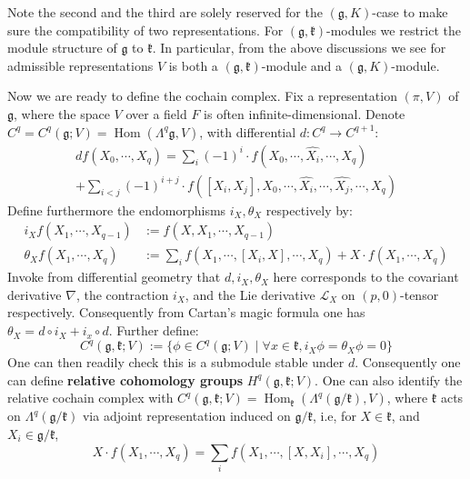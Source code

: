 \documentclass[11pt]{report}
\theoremstyle{definition}
\theoremstyle{plain}
\DeclareMathOperator{\Hom}{Hom}
\renewcommand{\hat}{\widehat}
\newcommand{\Lie}[1]{\mathfrak{#1}}
\begin{document}
Note the second and the third are solely reserved for the $(\Lie{g}, K)$-case to make sure the compatibility of two representations. For $(\Lie{g}, \Lie{k})$-modules we restrict the module structure of $\Lie{g}$ to $\Lie{k}$. In particular, from the above discussions we see for admissible representations $V$ is both a $(\Lie{g}, \Lie{k})$-module and a $(\Lie{g}, K)$-module.
\par Now we are ready to define the cochain complex. Fix a representation $(\pi, V)$ of $\Lie{g}$, where the space $V$ over a field $F$ is often infinite-dimensional. Denote $C^q=C^q(\Lie{g}; V)=\Hom(\Lambda^q\Lie{g}, V)$, with differential $d:C^q\to C^{q+1}$:
\begin{multline}\label{borel1.1.1}
df(X_0,\cdots , X_q)=\sum_i(-1)^i\cdot f(X_0, \cdots, \hat{X_i}, \cdots, X_q)\\
+\sum_{i<j}(-1)^{i+j}\cdot f([X_i, X_j], X_0, \cdots , \hat{X_i}, \cdots, \hat{X_j}, \cdots, X_q)
\end{multline}
Define furthermore the endomorphisms $i_X, \theta_X$ respectively by:
\begin{equation}
\begin{split}
i_Xf(X_1, \cdots, X_{q-1})&:=f(X, X_1, \cdots, X_{q-1})\\
\theta_Xf(X_1, \cdots, X_q)&:=\sum_if(X_1, \cdots, [X_i,X], \cdots,X_q)+X\cdot f(X_1, \cdots, X_q)
\end{split}
\end{equation}
Invoke from differential geometry that $d, i_X, \theta_X$ here corresponds to the covariant derivative $\nabla$, the contraction $i_X$, and the Lie derivative $\mathcal{L}_X$ on $(p,0)$-tensor respectively. Consequently from Cartan's magic formula one has $\theta_X=d\circ i_X+i_x\circ d$. Further define:
\begin{equation}
C^q(\Lie{g}, \Lie{k};V) :=\{\phi\in C^q(\Lie{g};V)\mid \forall x\in \Lie{k}, i_X\phi=\theta_X\phi=0 \}
\end{equation}
One can then readily check this is a submodule stable under $d$. Consequently one can define \textbf{relative cohomology groups} $H^q(\Lie{g}, \Lie{k}; V)$. One can also identify the relative cochain complex with $C^q(\Lie{g}, \Lie{k};V)=\Hom_{\Lie{k}}(\Lambda^q(\Lie{g}/\Lie{k}), V)$, where $\Lie{k}$ acts on $\Lambda^q(\Lie{g}/\Lie{k})$ via adjoint representation induced on $\Lie{g/k}$, i.e, for $X\in \Lie{k}$, and $X_i\in \Lie{g/k}$,
\begin{equation}
X\cdot f(X_1,\cdots, X_q)=\sum_i f(X_1, \cdots, [X,X_i],\cdots,X_q)
\end{equation} 
\end{document}
